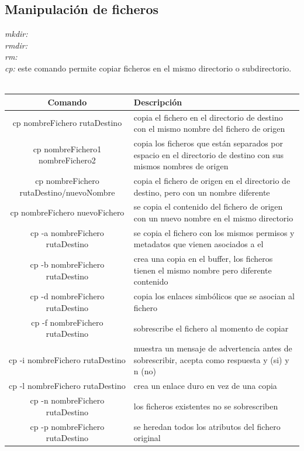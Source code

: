 \documentclass[10pt,a4paper,titlepage]{article}
\begin{document}
	\subsection*{Manipulación de ficheros}
	\emph{mkdir:}
	\\
	\emph{rmdir:}
	\\
	\emph{rm:}
	\\
	\emph{cp:} este comando permite copiar ficheros en el mismo directorio o subdirectorio.
	\\
	\\
	\begin{tabular}{|c|p{8cm}|}
		\hline
		Comando & Descripción \\
		\hline
		cp nombreFichero rutaDestino & copia el fichero en el directorio de destino con el mismo nombre del fichero de origen \\
		\hline
		cp nombreFichero1 nombreFichero2 & copia los ficheros que están separados por espacio en el directorio de destino con sus mismos nombres de origen \\
		\hline
		cp nombreFichero rutaDestino/nuevoNombre & copia el fichero de origen en el directorio de destino, pero con un nombre diferente \\
		\hline
		cp nombreFichero nuevoFichero & se copia el contenido del fichero de origen con un nuevo nombre en el mismo directorio \\
		\hline
		cp -a nombreFichero rutaDestino & se copia el fichero con los mismos permisos y metadatos que vienen asociados a el \\
		\hline
		cp -b nombreFichero rutaDestino & crea una copia en el buffer, los ficheros tienen el mismo nombre pero diferente contenido \\
		\hline
		cp -d nombreFichero rutaDestino & copia los enlaces simbólicos que se asocian al fichero \\
		\hline
		cp -f nombreFichero rutaDestino & sobrescribe el fichero al momento de copiar \\
		\hline
		cp -i nombreFichero rutaDestino & muestra un mensaje de advertencia antes de sobrescribir, acepta como respuesta y (si) y n (no) \\
		\hline
		cp -l nombreFichero rutaDestino & crea un enlace duro en vez de una copia \\
		\hline
		cp -n nombreFichero rutaDestino & los ficheros existentes no se sobrescriben \\
		\hline
		cp -p nombreFichero rutaDestino & se heredan todos los atributos del fichero original \\

\end{tabular}
\end{document}
